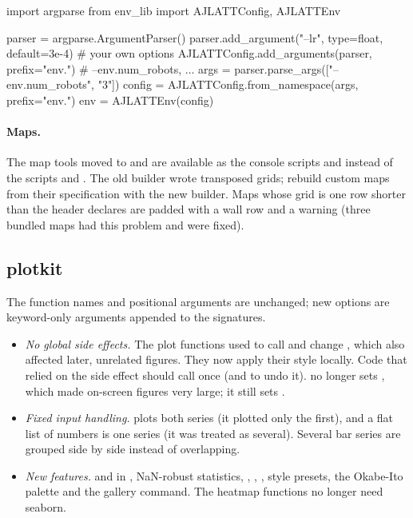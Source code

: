 \begin{pycode}
import argparse
from env_lib import AJLATTConfig, AJLATTEnv

parser = argparse.ArgumentParser()
parser.add_argument("--lr", type=float, default=3e-4)       # your own options
AJLATTConfig.add_arguments(parser, prefix="env.")           # --env.num_robots, ...
args = parser.parse_args(["--env.num_robots", "3"])
config = AJLATTConfig.from_namespace(args, prefix="env.")
env = AJLATTEnv(config)
\end{pycode}

\paragraph{Maps.}
The map tools moved to  and are available as
the console scripts  and 
instead of the scripts  and . The old
builder wrote transposed grids; rebuild custom maps from their specification
with the new builder. Maps whose grid is one row shorter than the header
declares are padded with a wall row and a warning (three bundled maps had this
problem and were fixed).

\subsection{plotkit}\label{sec:migration-plotkit}

The function names and positional arguments are unchanged; new options are
keyword-only arguments appended to the signatures.

\begin{itemize}
  \item \emph{No global side effects.} The plot functions used to call
     and change , which also
    affected later, unrelated figures. They now apply their style locally.
    Code that relied on the side effect should call 
    once (and  to undo it).  no
    longer sets , which made on-screen figures very large;
    it still sets .
  \item \emph{Fixed input handling.}  plots both
    series (it plotted only the first), and a flat list of numbers is one
    series (it was treated as several). Several bar series are grouped side by
    side instead of overlapping.
  \item \emph{New features.}  and  in
    , NaN-robust statistics,
    , , ,
    style presets, the Okabe-Ito palette and the gallery command. The heatmap
    functions no longer need seaborn.
\end{itemize}

